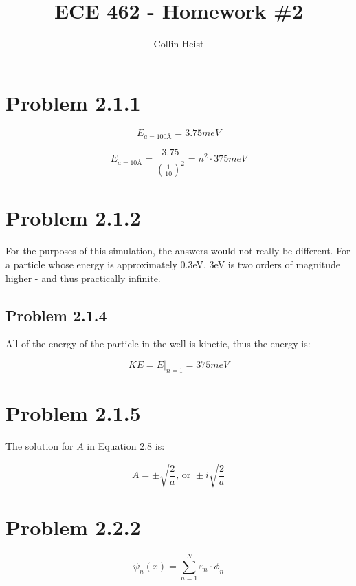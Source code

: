 \documentclass[11pt]{article}
\author{Collin Heist}
\title{ECE 462 - Homework \#2}
\begin{document}
    
    
    \maketitle
    
    

    

    \hypertarget{problem-2.1.1}{%
\section{Problem 2.1.1}\label{problem-2.1.1}}

\[E_{a=100Å}=3.75meV\]

\[E_{a=10Å}=\frac{3.75}{(\frac{1}{10})^2}=n^2\cdot375meV\]

    \hypertarget{problem-2.1.2}{%
\section{Problem 2.1.2}\label{problem-2.1.2}}

For the purposes of this simulation, the answers would not really be
different. For a particle whose energy is approximately 0.3eV, 3eV is
two orders of magnitude higher - and thus practically infinite.

    \hypertarget{problem-2.1.4}{%
\subsection{Problem 2.1.4}\label{problem-2.1.4}}

All of the energy of the particle in the well is kinetic, thus the
energy is:

\[KE=E|_{n=1}=375meV\]

    \hypertarget{problem-2.1.5}{%
\section{Problem 2.1.5}\label{problem-2.1.5}}

The solution for \(A\) in Equation 2.8 is:

\[A=\pm\sqrt{\frac{2}{a}}\text{, or }\pm i\sqrt{\frac{2}{a}}\]

    \hypertarget{problem-2.2.2}{%
\section{Problem 2.2.2}\label{problem-2.2.2}}

\[\psi_n(x)=\sum_{n=1}^{N}\varepsilon_n\cdot\phi_n\]


    
    
    
    
\end{document}
